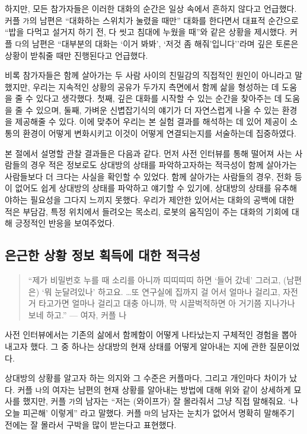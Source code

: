 하지만, 모든 참가자들은 이러한 대화의 순간은 일상 속에서 흔하지 않다고 언급했다. 커플 \texttt{가}의 남편은 ``대화하는 스위치가 눌렸을 때만'' 대화를 한다면서 대표적 순간으로 ``밥을 다먹고 설거지 하기 전, 다 씻고 침대에 누웠을 때''와 같은 상황을 제시했다. 커플 \texttt{다}의 남편은 ``대부분의 대화는 `이거 봐봐', `저것 좀 해줘'입니다''라며 깊은 토론은 상황이 받춰줄 때만 진행된다고 언급했다.

비록 참가자들은 \concept\가 함께 살아가는 두 사람 사이의 친밀감의 직접적인 원인이 아니라고 말했지만, 우리는 지속적인 상황의 공유가 두가지 측면에서 함께 삶을 형성하는 데 도움을 줄 수 있다고 생각했다. 첫째, 깊은 대화를 시작할 수 있는 순간을 찾아주는 데 도움을 줄 수 있으며, 둘째, 가벼운 신볍잡기식의 얘기가 더 자연스럽게 나올 수 있는 환경을 제공해줄 수 있다. 이에 맞추어 우리는 본 실험 결과를 해석하는 데 있어  제공이 소통의 환경이 어떻게 변화시키고 이것이  어떻게 연결되는지를 서술하는데 집중하였다.

본 절에서 설명할 관찰 결과들은 다음과 같다. 먼저 사전 인터뷰를 통해 떨어져 사는 사람들의 경우 적은 정보로도 상대방의 상태를 파악하고자하는 적극성이 함께 살아가는 사람들보다 더 크다는 사실을 확인할 수 있었다. 함께 살아가는 사람들의 경우, 전화 등이 없어도 쉽게 상대방의 상태를 파악하고 얘기할 수 있기에, 상대방의 상태를 유추해야하는 필요성을 그다지 느끼지 못했다. 우리가 제안한  있어서는 대화의 공백에 대한 적은 부담감, 특정 위치에서 들려오는 목소리, 로봇의 움직임이 주는 대화의 기회에 대해 긍정적인 반응을 보여주었다.


\subsection{은근한 상황 정보 획득에 대한 적극성}

\begin{quote}
``제가 비밀번호 누를 때 소리를 아니까 띠띠띠띠 하면 `들어 갔네' 그러고, (남편은) `뭐 눈달려있나' 하고요. \ldots 또 연구실에 집까지 걸 어서 얼마나 걸리고, 자전거 타고가면 얼마나 걸리고 대충 아니까, 막 시끌벅적하면 아 거기쯤 지나가나 보네 하고.'' --- 여자, 커플 나
\end{quote}

사전 인터뷰에서는 기존의 삶에서 함께함이 어떻게 나타났는지 구체적인 경험을 뽑아내고자 했다. 그 중 하나는 상대방의 현재 상태를 어떻게 알아내는 지에 관한 질문이었다.

상대방의 상황를 알고자 하는 의지와 그 수준은 커플마다, 그리고 개인마다 차이가 났다. 커플 \texttt{나}의 여자는 남편의 현재 상황를 알아내는 방법에 대해 위와 같이 상세하게 묘사를 했지만, 커플 \texttt{가}의 남자는 ``저는 (와이프가) 잘 몰라줘서 그냥 직접 말해줘요. `나 오늘 피곤해' 이렇게'' 라고 말했다. 커플 \texttt{마}의 남자는 눈치가 없어서 명확히 말해주기 전에는 잘 몰라서 구박을 많이 받는다고 표현했다.

